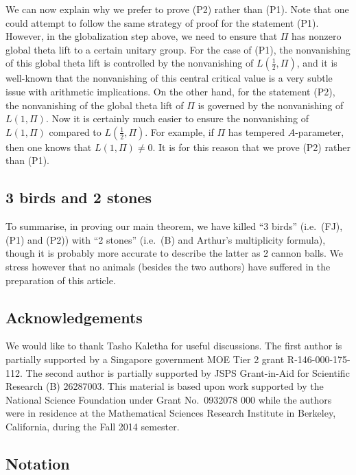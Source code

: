 \documentclass[11pt]{amsart}
\numberwithin{equation}{section}
\theoremstyle{plain}
\theoremstyle{definition}
\theoremstyle{remark}
\begin{document}
We can now explain why we prefer to prove (P2) rather than (P1). Note that one could attempt to follow the same strategy of proof for the statement (P1). However, in the globalization step above, we need to ensure that $\Pi$ has nonzero global theta lift to a certain unitary group. For the case of (P1), the nonvanishing of this global theta lift is controlled by the nonvanishing of $L(\frac{1}{2}, \Pi)$, and it is well-known that the nonvanishing of this central critical value is a very subtle issue with arithmetic implications.  On the other hand, for the statement (P2), the nonvanishing of the global theta lift of $\Pi$ is governed by the nonvanishing of $L(1,\Pi)$. Now it is certainly much easier to ensure the nonvanishing of $L(1, \Pi)$ compared to $L(\frac{1}{2},\Pi)$. For example, if $\Pi$ has tempered $A$-parameter, then one knows that $L(1, \Pi) \ne 0$. It is for this reason that we prove (P2) rather than (P1).

\subsection{3 birds and 2 stones}

To summarise, in proving our main theorem, we have killed ``3 birds'' (i.e.~(FJ), (P1) and (P2)) with ``2 stones'' (i.e.~(B) and Arthur's multiplicity formula), though it is probably more accurate to describe the latter as 2 cannon balls. We stress however that no animals (besides the two authors) have suffered in the preparation of this article. 

\subsection*{Acknowledgements}

We would like to thank Tasho Kaletha for useful discussions.
The first author is partially supported by a Singapore government MOE Tier 2 grant R-146-000-175-112.
The second author is partially supported by JSPS Grant-in-Aid for Scientific Research (B) 26287003.
This material is based upon work supported by the National Science Foundation under Grant No.~0932078 000 while the authors were in residence at the Mathematical Sciences Research Institute in Berkeley, California, during the Fall 2014 semester.

\subsection*{Notation}
\end{document}
